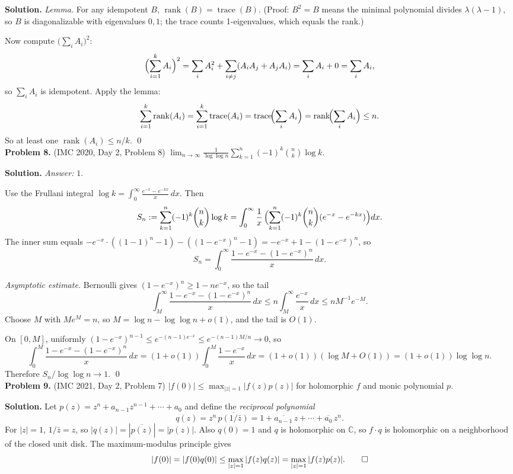 \documentclass{article}
\newcommand{\C}{\mathbb{C}}
\newcommand{\tr}{\operatorname{trace}}
\newcommand{\rank}{\operatorname{rank}}
\begin{document}
\textbf{Solution.} \emph{Lemma.} For any idempotent \( B \), \( \rank(B) = \tr(B) \).
(Proof: \( B^2 = B \) means the minimal polynomial divides \( \lambda(\lambda - 1) \), so \( B \) is diagonalizable with eigenvalues \( 0, 1 \); the trace counts 1-eigenvalues, which equals the rank.)

Now compute \( \bigl(\sum_i A_i\bigr)^2 \):
\[
\Bigl(\sum_{i=1}^k A_i\Bigr)^2 = \sum_i A_i^2 + \sum_{i \neq j}(A_i A_j + A_j A_i) = \sum_i A_i + 0 = \sum_i A_i,
\]
so \( \sum_i A_i \) is idempotent. Apply the lemma:
\[
\sum_{i=1}^k \rank(A_i) = \sum_{i=1}^k \tr(A_i) = \tr\!\Bigl(\sum_i A_i\Bigr) = \rank\!\Bigl(\sum_i A_i\Bigr) \leq n.
\]
So at least one \( \rank(A_i) \leq n/k \). \qed
\\

\textbf{Problem 8.} (IMC 2020, Day 2, Problem 8)
\( \displaystyle \lim_{n \to \infty} \frac{1}{\log \log n} \sum_{k=1}^{n} (-1)^k \binom{n}{k} \log k \).

\textbf{Solution.} \textit{Answer:} \( 1 \).

Use the Frullani integral \( \log k = \int_0^\infty \frac{e^{-x} - e^{-kx}}{x}\, dx \). Then
\[
S_n := \sum_{k=1}^{n} (-1)^k \binom{n}{k} \log k
= \int_0^\infty \frac{1}{x}\, \Bigl(\sum_{k=1}^{n} (-1)^k \binom{n}{k}(e^{-x} - e^{-kx})\Bigr) dx.
\]
The inner sum equals \( -e^{-x} \cdot ((1{-}1)^n - 1) - ((1 - e^{-x})^n - 1) = -e^{-x} + 1 - (1 - e^{-x})^n \), so
\[
S_n = \int_0^\infty \frac{1 - e^{-x} - (1 - e^{-x})^n}{x}\, dx.
\]

\emph{Asymptotic estimate.} Bernoulli gives \( (1 - e^{-x})^n \geq 1 - n e^{-x} \), so the tail
\[
\int_M^\infty \frac{1 - e^{-x} - (1 - e^{-x})^n}{x}\, dx \leq n \int_M^\infty \frac{e^{-x}}{x}\, dx \leq n M^{-1} e^{-M}.
\]
Choose \( M \) with \( M e^M = n \), so \( M = \log n - \log\log n + o(1) \), and the tail is \( O(1) \).

On \( [0, M] \), uniformly \( (1 - e^{-x})^{n-1} \leq e^{-(n-1)e^{-x}} \leq e^{-(n-1)M/n} \to 0 \), so
\[
\int_0^M \frac{1 - e^{-x} - (1 - e^{-x})^n}{x}\, dx
= (1 + o(1)) \int_0^M \frac{1 - e^{-x}}{x}\, dx
= (1 + o(1)) (\log M + O(1)) = (1 + o(1)) \log \log n.
\]
Therefore \( S_n / \log \log n \to 1 \). \qed
\\

\textbf{Problem 9.} (IMC 2021, Day 2, Problem 7)
\( |f(0)| \leq \max_{|z|=1} |f(z) p(z)| \) for holomorphic \( f \) and monic polynomial \( p \).

\textbf{Solution.}
Let \( p(z) = z^n + a_{n-1} z^{n-1} + \cdots + a_0 \) and define the \emph{reciprocal polynomial}
\[
q(z) = z^n\, \overline{p(1/\bar z)} = 1 + \overline{a_{n-1}}\, z + \cdots + \overline{a_0}\, z^n.
\]
For \( |z| = 1 \), \( 1/\bar z = z \), so \( |q(z)| = |\overline{p(z)}| = |p(z)| \). Also \( q(0) = 1 \) and \( q \) is holomorphic on \( \C \), so \( f \cdot q \) is holomorphic on a neighborhood of the closed unit disk. The maximum-modulus principle gives
\[
|f(0)| = |f(0) q(0)| \leq \max_{|z|=1} |f(z) q(z)| = \max_{|z|=1} |f(z) p(z)|. \qed
\]
\\
\end{document}
